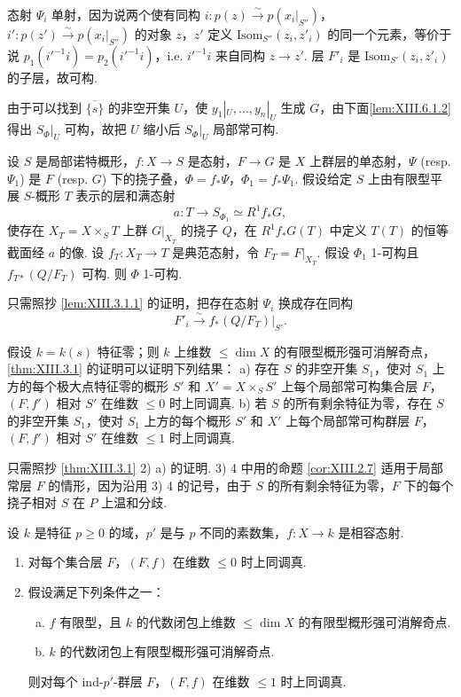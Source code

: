 态射 $\Psi_i$ 单射，因为说两个使有同构 $i \colon p(z) \xrightarrow{\sim} p(x_i|_{S''})$，$i' \colon p(z') \xrightarrow{\sim} p(x_i|_{S''})$ 的对象 $z$，$z'$ 定义 $\mathrm{Isom}_{S''}(z_i, z'_i)$ 的同一个元素，等价于说 $p_1(i'^{-1} i) = p_2(i'^{-1} i)$，i.e. $i'^{-1} i$ 来自同构 $z \to z'$. 层 $F'_i$ 是 $\mathrm{Isom}_{S'}(z_i, z'_i)$ 的子层，故可构.

由于可以找到 $\overline{\{s\}}$ 的非空开集 $U$，使 $y_1|_U, \ldots, y_n|_U$ 生成 $G$，由下面\cref{lem:XIII.6.1.2} 得出 $S_\Phi|_U$ 可构，故把 $U$ 缩小后 $S_\Phi|_U$ 局部常可构.

\begin{lemma}\label{lem:XIII.3.1.2}
设 $S$ 是局部诺特概形，$f \colon X \to S$ 是态射，$F \to G$ 是 $X$ 上群层的单态射，$\Psi$ (resp. $\Psi_1$) 是 $F$ (resp. $G$) 下的挠子叠，$\Phi = f_* \Psi$，$\Phi_1 = f_* \Psi_1$. 假设给定 $S$ 上由有限型平展 $S$-概形 $T$ 表示的层和满态射
\[
a \colon T \longrightarrow S_{\Phi_1} \simeq R^1 f_* G,
\]
使存在 $X_T = X \times_S T$ 上群 $G|_{X_T}$ 的挠子 $Q$，在 $R^1 f_* G(T)$ 中定义 $T(T)$ 的恒等截面经 $a$ 的像. 设 $f_T \colon X_T \to T$ 是典范态射，令 $F_T = F|_{X_T}$. 假设 $\Phi_1$ 1-可构且 $f_{T*}(Q/F_T)$ 可构. 则 $\Phi$ 1-可构.
\end{lemma}

只需照抄 \ref{lem:XIII.3.1.1} 的证明，把存在态射 $\Psi_i$ 换成存在同构
\[
F'_i \xrightarrow{\sim} f_*(Q/F_T)|_{S'}.
\]

\begin{remark}\label{rem:XIII.3.1.3}
假设 $k = k(s)$ 特征零；则 $k$ 上维数 $\leqslant \dim X$ 的有限型概形强可消解奇点，\ref{thm:XIII.3.1} 的证明可以证明下列结果：
a) 存在 $S$ 的非空开集 $S_1$，使对 $S_1$ 上方的每个极大点特征零的概形 $S'$ 和 $X' = X \times_S S'$ 上每个局部常可构集合层 $F$，$(F, f')$ 相对 $S'$ 在维数 $\leqslant 0$ 时上同调真.
b) 若 $S$ 的所有剩余特征为零，存在 $S$ 的非空开集 $S_1$，使对 $S_1$ 上方的每个概形 $S'$ 和 $X'$ 上每个局部常可构群层 $F$，$(F, f')$ 相对 $S'$ 在维数 $\leqslant 1$ 时上同调真.

只需照抄 \ref{thm:XIII.3.1} 2) a) 的证明. 3) 4 中用的命题 \ref{cor:XIII.2.7} 适用于局部常层 $F$ 的情形，因为沿用 3) 4 的记号，由于 $S$ 的所有剩余特征为零，$F$ 下的每个挠子相对 $S$ 在 $P$ 上温和分歧.
\end{remark}

\begin{corollary}\label{cor:XIII.3.2}
设 $k$ 是特征 $p \geqslant 0$ 的域，$p'$ 是与 $p$ 不同的素数集，$f \colon X \to k$ 是相容态射.
\begin{enumerate}[1)]
\item 对每个集合层 $F$，$(F, f)$ 在维数 $\leqslant 0$ 时上同调真.
\item 假设满足下列条件之一：
\begin{enumerate}[a)]
\item $f$ 有限型，且 $k$ 的代数闭包上维数 $\leqslant \dim X$ 的有限型概形强可消解奇点.
\item $k$ 的代数闭包上有限型概形强可消解奇点.
\end{enumerate}
则对每个 ind-$p'$-群层 $F$，$(F, f)$ 在维数 $\leqslant 1$ 时上同调真.
\end{enumerate}
\end{corollary}

